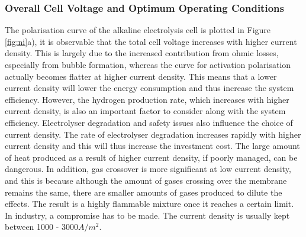 \documentclass[11pt, a4paper]{article}
\begin{document}
\subsubsection{Overall Cell Voltage and Optimum Operating Conditions}
The polarisation curve of the alkaline electrolysis cell is plotted in Figure \ref{fig:ni}a), it is observable that the total cell voltage increases with higher current density. This is largely due to the increased contribution from ohmic losses, especially from bubble formation, whereas the curve for activation polarisation actually becomes flatter at higher current density. This means that a lower current density will lower the energy consumption and thus increase the system efficiency. However, the hydrogen production rate, which increases with higher current density,  is also an important factor to consider along with the system efficiency.  Electrolyser degradation and safety issues also influence the choice of current density. The rate of electrolyser degradation increases rapidly with higher current density and this will thus increase the investment cost. The large amount of heat produced as a result of higher current density, if poorly managed, can be dangerous. In addition, gas crossover is more significant at low current density, and this is because although the amount of gases crossing over the membrane remains the same, there are smaller amounts of gases produced to dilute the effects. The result is a highly flammable mixture once it reaches a certain limit. In industry, a compromise has to be made. The current density is usually kept between 1000 - 3000$A/m^2$. \cite{currentdensity}
\end{document}
